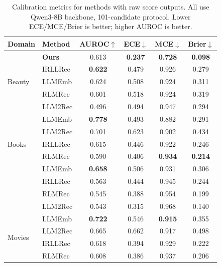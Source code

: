 \begin{table}[t]
\centering
\small
\caption{Calibration metrics for methods with raw score outputs. All use Qwen3-8B backbone, 101-candidate protocol. Lower ECE/MCE/Brier is better; higher AUROC is better.}
\label{tab:calibration}
\begin{tabular}{ll|cccc}
\toprule
Domain & Method & AUROC$\uparrow$ & ECE$\downarrow$ & MCE$\downarrow$ & Brier$\downarrow$ \\
\midrule
\multirow{5}{*}{Beauty}
& \textbf{Ours} & 0.613 & \textbf{0.237} & \textbf{0.728} & \textbf{0.098} \\
& IRLLRec & \textbf{0.622} & 0.479 & 0.926 & 0.279 \\
& LLMEmb & 0.624 & 0.508 & 0.924 & 0.311 \\
& RLMRec & 0.601 & 0.518 & 0.924 & 0.319 \\
& LLM2Rec & 0.496 & 0.494 & 0.947 & 0.294 \\
\midrule
\multirow{5}{*}{Books}
& LLMEmb & \textbf{0.778} & 0.493 & 0.882 & 0.291 \\
& LLM2Rec & 0.701 & 0.623 & 0.902 & 0.434 \\
& IRLLRec & 0.615 & 0.446 & 0.922 & 0.246 \\
& RLMRec & 0.590 & 0.406 & \textbf{0.934} & \textbf{0.214} \\
\midrule
\multirow{4}{*}{Electronics}
& LLMEmb & \textbf{0.658} & 0.506 & 0.931 & 0.306 \\
& IRLLRec & 0.563 & 0.444 & 0.945 & 0.244 \\
& RLMRec & 0.545 & 0.388 & 0.954 & 0.199 \\
& LLM2Rec & 0.543 & 0.315 & 0.968 & 0.140 \\
\midrule
\multirow{4}{*}{Movies}
& LLMEmb & \textbf{0.722} & 0.546 & \textbf{0.915} & 0.355 \\
& LLM2Rec & 0.665 & 0.662 & 0.917 & 0.498 \\
& IRLLRec & 0.618 & 0.394 & 0.929 & 0.222 \\
& RLMRec & 0.608 & 0.386 & 0.937 & 0.206 \\
\bottomrule
\end{tabular}
\vspace{-2mm}
\end{table}
